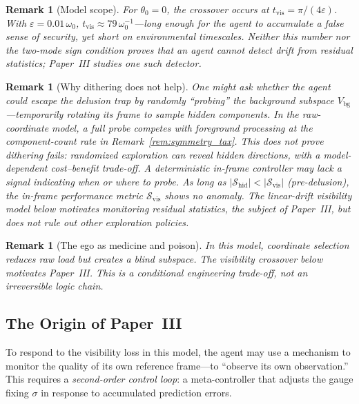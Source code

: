 \documentclass[12pt]{article}
\newtheorem{remark}[theorem]{Remark}
\begin{document}
\begin{remark}[Model scope]
\label{rem:linear_drift}
For $\theta_0=0$, the crossover occurs at
$t_{\mathrm{vis}} = \pi/(4\varepsilon)$.
With $\varepsilon = 0.01\,\omega_0$,
$t_{\mathrm{vis}} \approx 79\,\omega_0^{-1}$---long
enough for the agent to accumulate a false sense of
security, yet short on environmental timescales.
Neither this number nor the two-mode sign condition proves that an
agent cannot detect drift from residual statistics; Paper~III studies
one such detector.
\end{remark}

\begin{remark}[Why dithering does not help]
\label{rem:dithering}
One might ask whether the agent could escape the delusion
trap by randomly ``probing'' the background subspace
$V_{\mathrm{bg}}$---temporarily rotating its frame to
sample hidden components.
In the raw-coordinate model, a full probe competes with foreground
processing at the component-count rate in
Remark~\ref{rem:symmetry_tax}.  This does not prove dithering fails:
randomized exploration can reveal hidden directions, with a
model-dependent cost--benefit trade-off.  A deterministic in-frame
controller may lack a signal indicating when or where to probe.
As long as $|\mathcal{S}_{\mathrm{hid}}|
< |\mathcal{S}_{\mathrm{vis}}|$ (pre-delusion), the
in-frame performance metric $\mathcal{S}_{\mathrm{vis}}$
shows no anomaly.
The linear-drift visibility model below motivates monitoring residual
statistics, the subject of Paper~III, but does not rule out other
exploration policies.
\end{remark}

\begin{remark}[The ego as medicine and poison]
\label{rem:medicine_poison}
In this model, coordinate selection reduces raw load but creates a blind
subspace.  The visibility crossover below motivates Paper~III.  This is
a conditional engineering trade-off, not an irreversible logic chain.
\end{remark}

\subsection{The Origin of Paper~III}
\label{subsec:paper3}

To respond to the visibility loss in this model, the agent may use a mechanism
to monitor the quality of its own reference frame---to
``observe its own observation.''
This requires a \emph{second-order control loop}: a
meta-controller that adjusts the gauge fixing $\sigma$ in
response to accumulated prediction errors.
\end{document}
